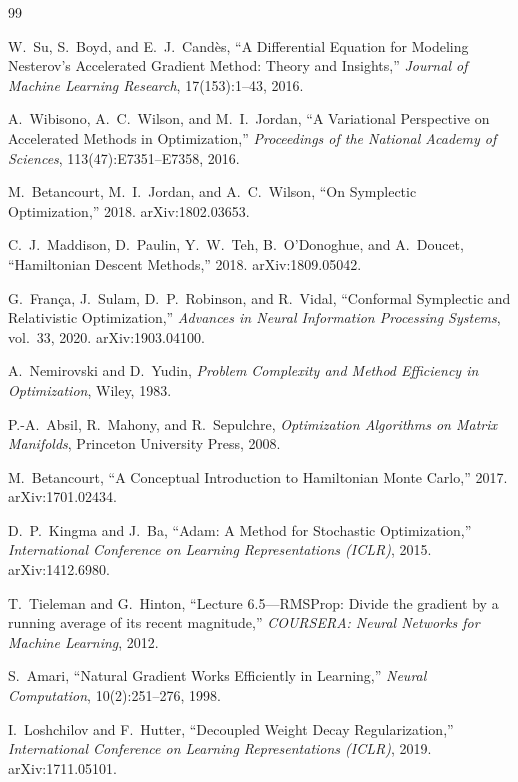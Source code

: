 \documentclass[10pt,twocolumn]{article}
\begin{document}
\begin{thebibliography}{99}

W.~Su, S.~Boyd, and E.~J.~Cand\`es,
``A Differential Equation for Modeling Nesterov's Accelerated Gradient
Method: Theory and Insights,''
\emph{Journal of Machine Learning Research}, 17(153):1--43, 2016.

A.~Wibisono, A.~C.~Wilson, and M.~I.~Jordan,
``A Variational Perspective on Accelerated Methods in Optimization,''
\emph{Proceedings of the National Academy of Sciences},
113(47):E7351--E7358, 2016.

M.~Betancourt, M.~I.~Jordan, and A.~C.~Wilson,
``On Symplectic Optimization,'' 2018.
arXiv:1802.03653.

C.~J.~Maddison, D.~Paulin, Y.~W.~Teh, B.~O'Donoghue, and A.~Doucet,
``Hamiltonian Descent Methods,'' 2018.
arXiv:1809.05042.

G.~Fran\c ca, J.~Sulam, D.~P.~Robinson, and R.~Vidal,
``Conformal Symplectic and Relativistic Optimization,''
\emph{Advances in Neural Information Processing Systems}, vol.~33, 2020.
arXiv:1903.04100.

A.~Nemirovski and D.~Yudin,
\emph{Problem Complexity and Method Efficiency in Optimization},
Wiley, 1983.

P.-A.~Absil, R.~Mahony, and R.~Sepulchre,
\emph{Optimization Algorithms on Matrix Manifolds},
Princeton University Press, 2008.

M.~Betancourt,
``A Conceptual Introduction to Hamiltonian Monte Carlo,'' 2017.
arXiv:1701.02434.

D.~P.~Kingma and J.~Ba,
``Adam: A Method for Stochastic Optimization,''
\emph{International Conference on Learning Representations (ICLR)}, 2015.
arXiv:1412.6980.

T.~Tieleman and G.~Hinton,
``Lecture 6.5---RMSProp: Divide the gradient by a running average of its
recent magnitude,''
\emph{COURSERA: Neural Networks for Machine Learning}, 2012.

S.~Amari,
``Natural Gradient Works Efficiently in Learning,''
\emph{Neural Computation}, 10(2):251--276, 1998.

I.~Loshchilov and F.~Hutter,
``Decoupled Weight Decay Regularization,''
\emph{International Conference on Learning Representations (ICLR)}, 2019.
arXiv:1711.05101.


\end{thebibliography}
\end{document}
